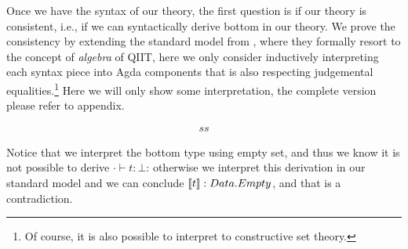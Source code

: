 Once we have the syntax of our theory, the first question is if our theory is consistent, i.e., if we can syntactically derive bottom in our theory. We prove the consistency by extending the standard model from \citep{kaposi2017type}, where they formally resort to the concept of \textit{algebra} of QIIT, here we only consider inductively interpreting each syntax piece into Agda components that is also respecting judgemental equalities.\footnote{Of course, it is also possible to interpret to constructive set theory.} 
Here we will only show some interpretation, the complete version please refer to appendix.

\begin{align*}
  ss
\end{align*}


Notice that we interpret the bottom type using empty set, and thus we know it is not possible to derive $\cdot \vdash t : \bot$: otherwise we interpret this derivation in our standard model and we can conclude ${\llbracket {t} \rrbracket} : Data.Empty$, 
and that is a contradiction.
